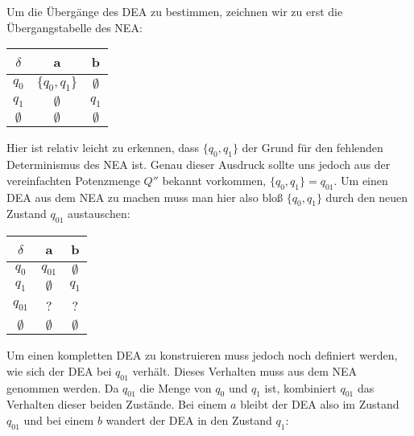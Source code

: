 \begin{flushleft}
    Um die Übergänge des DEA zu bestimmen, zeichnen wir zu erst die Übergangstabelle des NEA:
\end{flushleft}
    
\begin{center}
\begin{tabular}{|c|c|c|}
    \hline
    $\delta$ & a & b \\
    \hline
    $q_0$ & $\{q_0,q_1\}$ & $\emptyset$ \\
    \hline
    $q_1$ & $\emptyset$ & $q_1$ \\
    \hline
    $\emptyset$ & $\emptyset$ & $\emptyset$ \\
    \hline
\end{tabular}
\end{center}

\begin{flushleft}
    Hier ist relativ leicht zu erkennen, dass $\{q_0,q_1\}$ der Grund für den fehlenden 
    Determinismus des NEA ist. Genau dieser Ausdruck sollte uns jedoch aus der vereinfachten Potenzmenge 
    $Q''$ bekannt vorkommen, $\{q_0,q_1\}=q_{01}$. Um einen DEA aus dem NEA zu machen muss man hier also bloß 
    $\{q_0,q_1\}$ durch den neuen Zustand $q_{01}$ austauschen:
\end{flushleft}
    
\begin{center}
\begin{tabular}{|c|c|c|}
    \hline
    $\delta$ & a & b \\
    \hline
    $q_0$ & $q_{01}$ & $\emptyset$ \\
    \hline
    $q_1$ & $\emptyset$ & $q_1$ \\
    \hline
    $q_{01}$ & ? & ? \\
    \hline
    $\emptyset$ & $\emptyset$ & $\emptyset$ \\
    \hline
\end{tabular}
\end{center}

\begin{flushleft}
    Um einen kompletten DEA zu konstruieren muss jedoch noch definiert werden, wie sich der DEA bei $q_{01}$ verhält.
    Dieses Verhalten muss aus dem NEA genommen werden. Da $q_{01}$ die Menge von $q_0$ und $q_1$ ist, kombiniert $q_{01}$
    das Verhalten dieser beiden Zustände. Bei einem $a$ bleibt der DEA also im Zustand $q_{01}$ und bei einem $b$ wandert 
    der DEA in den Zustand $q_1$:
\end{flushleft}

